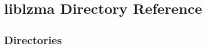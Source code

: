 \section{liblzma Directory Reference}
\label{dir_2e0898c272e1f0f93c8ef15f5da2a912}
\subsection*{Directories}
\begin{DoxyCompactItemize}
\end{DoxyCompactItemize}
